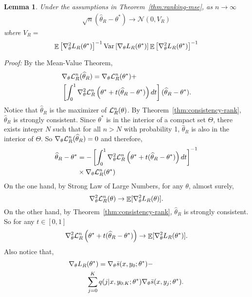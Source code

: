 \documentclass[11pt,a4paper]{article}
\DeclareMathOperator{\E}{\mathbb{E}}
\newcommand{\var}{\operatorname{Var}}
\newcommand{\wh}[1]{\widehat{#1}}
\newcommand{\gtheta}{\ensuremath \nabla_{\theta}}
\newcommand{\objr}{{\cal L}_R^n}
\newcommand{\ssf}[3]{\bar{s}(#1, #2; #3)}
\newtheorem{lemma}{Lemma}[section]
\begin{document}
\begin{lemma}
  Under the assumptions in Theorem~\ref{thm:ranking-mse}, as $n\rightarrow\infty$
\begin{equation*}
\begin{aligned}
 \sqrt{n}\left(\wh{\theta}_R - \theta^*\right) \rightarrow  \mathcal{N}\left(0, V_R\right) 
\end{aligned}
\end{equation*}
where  $V_R = $
\[
\E \left[\gtheta^2 L_R(\theta^*)\right]^{-1} \var \left[\gtheta L_R(\theta^*) \right] \E \left[\gtheta^2 L_R(\theta^*)\right]^{-1}
\]
\label{lem:asym-rank}
\end{lemma}
{\em Proof:}
By the Mean-Value Theorem,
\begin{equation*}
\begin{aligned}
& \gtheta \objr(\wh{\theta}_R) = \gtheta \objr(\theta^*)  + \\
& \left[\int_0^1 \gtheta^2 \objr\left(\theta^* + t(\wh{\theta}_R-\theta^*)  \right)dt\right] (\wh{\theta}_R - \theta^*). 
\end{aligned}
\end{equation*}
Notice that $\wh{\theta}_R$ is the maximizer of $\objr(\theta)$. By Theorem~\ref{thm:consistency-rank}, $\wh{\theta}_R$ is strongly consistent. Since $\theta^*$ is in the interior of a compact set $\Theta$, there exists integer $N$ such that for all $n > N$ with probability 1, $\wh{\theta}_R$ is also in the interior of $\Theta$. So $\gtheta \objr(\wh{\theta}_R) = 0 $ and therefore,
\begin{equation*}
\begin{aligned}
\wh{\theta}_R - \theta^* & =  -\left[\int_0^1 \gtheta^2 \objr\left(\theta^* + t(\wh{\theta}_R-\theta^*)  \right)dt\right]^{-1} \\ 
& \times \gtheta \objr(\theta^*) 
\end{aligned}
\end{equation*}
On the one hand, by Strong Law of Large Numbers, for any $\theta$, almost surely,
\[
\gtheta^2 \objr (\theta) \rightarrow  \E [ \gtheta^2 L_R(\theta) ].
\]
On the other hand, by Theorem~\ref{thm:consistency-rank}, $\wh{\theta}_R$ is strongly consistent. So for any $t\in [0, 1]$
 \begin{equation*}
    \gtheta^2 \objr\left(\theta^* + t(\wh{\theta}_R-\theta^*)  \right) \rightarrow \E[\gtheta^2 L_R(\theta^*)].
\end{equation*}
Also notice that, 
\begin{equation}
\begin{aligned}
 \gtheta L_R & (\theta^*) = \gtheta  \ssf{x}{y_0}{\theta^*} -  \\
 & \sum_{j=0}^K q( j | x, y_{0:K}; \theta^*) \gtheta \ssf{x}{y_j}{\theta^*}.
\label{eq:first-derivative-rank}
\end{aligned}
\end{equation}
\end{document}
